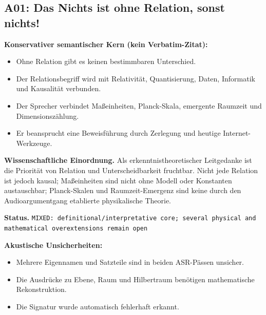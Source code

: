 \documentclass[11pt,a4paper]{article}
\newcommand{\status}[1]{\texttt{#1}}
\begin{document}
\subsection{A01: Das Nichts ist ohne Relation, sonst nichts!}
\label{sec:a01}
\textbf{Konservativer semantischer Kern (kein Verbatim-Zitat):}
\begin{itemize}
\item Ohne Relation gibt es keinen bestimmbaren Unterschied.
\item Der Relationsbegriff wird mit Relativität, Quantisierung, Daten, Informatik und Kausalität verbunden.
\item Der Sprecher verbindet Maßeinheiten, Planck-Skala, emergente Raumzeit und Dimensionszählung.
\item Er beansprucht eine Beweisführung durch Zerlegung und heutige Internet-Werkzeuge.
\end{itemize}

\textbf{Wissenschaftliche Einordnung.} Als erkenntnistheoretischer Leitgedanke ist die Priorität von Relation und Unterscheidbarkeit fruchtbar. Nicht jede Relation ist jedoch kausal; Maßeinheiten sind nicht ohne Modell oder Konstanten austauschbar; Planck-Skalen und Raumzeit-Emergenz sind keine durch den Audioargumentgang etablierte physikalische Theorie.

\textbf{Status.} \status{MIXED: definitional/interpretative core; several physical and mathematical overextensions remain open}

\textbf{Akustische Unsicherheiten:}
\begin{itemize}
\item Mehrere Eigennamen und Satzteile sind in beiden ASR-Pässen unsicher.
\item Die Ausdrücke zu Ebene, Raum und Hilbertraum benötigen mathematische Rekonstruktion.
\item Die Signatur wurde automatisch fehlerhaft erkannt.
\end{itemize}
\end{document}
